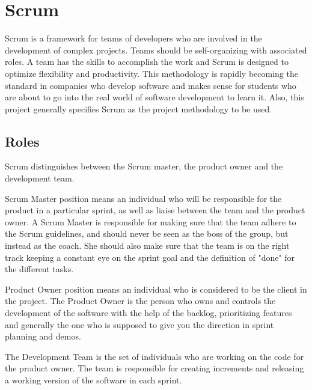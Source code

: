 \section{Scrum}
Scrum is a framework for teams of developers who are involved in the development of complex projects.
Teams should be self-organizing with associated roles. A team has the skills to accomplish the work and
Scrum is designed to optimize flexibility and productivity. This methodology is rapidly becoming the standard
in companies who develop software and makes sense for students who are about to go into the real world of
software development to learn it. Also, this project generally specifies Scrum as the project methodology to be used.

\subsection{Roles}

Scrum distinguishes between the Scrum master, the product owner and the development team.

Scrum Master position means an individual who will be responsible for the product in a
particular sprint, as well as liaise between the team and the product owner.
A Scrum Master is responsible for making sure that the team adhere to the Scrum guidelines,
and should never be seen as the boss of the group, but instead as the coach.
She should also make sure that the team is on the right track keeping a constant eye on the sprint goal
and the definition of "done" for the different tasks.

Product Owner position means an individual who is considered to be the client in the project.
The Product Owner is the person who owns and controls the development of the software with the help of the backlog,
prioritizing features and generally the one who is supposed to give you the direction in sprint planning and demos.

The Development Team is the set of individuals who are working on the code for the product owner.
The team is responsible for creating increments and releasing a working version of the software
in each sprint.

